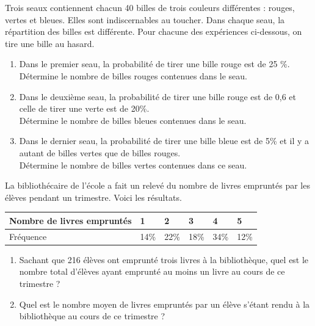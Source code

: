 \documentclass[../math2.tex]{subfiles}
\begin{document}
\begin{exercise}
    Trois seaux contiennent chacun 40 billes de trois couleurs différentes : rouges, vertes et bleues. Elles sont indiscernables au toucher. Dans chaque seau, la répartition des billes est différente. Pour chacune des expériences ci-dessous, on tire une bille au hasard.
    \begin{enumerate}[itemsep=4cm]
        \item Dans le premier seau, la probabilité de tirer une bille rouge est de 25 \%. \\Détermine le nombre de billes rouges contenues dans le seau.
        \item Dans le deuxième seau, la probabilité de tirer une bille rouge est de 0,6 et celle de tirer une verte est de 20\%. \\Détermine le nombre de billes bleues contenues dans le seau.
        \item Dans le dernier seau, la probabilité de tirer une bille bleue est de 5\% et il y a autant de billes vertes que de billes rouges. \\Détermine le nombre de billes vertes contenues dans ce seau.
        \vspace*{3cm}
    \end{enumerate}
\end{exercise}

\newpage

\begin{exercise}
    La bibliothécaire de l’école a fait un relevé du nombre de livres empruntés par les élèves pendant un trimestre. Voici les résultats.\\

    \begin{tabularx}{\linewidth}{|p{5cm}|Y|Y|Y|Y|Y|}
        \hline
        Nombre de livres empruntés & 1 & 2 & 3 & 4 & 5 \\
        \hline
        Fréquence & 14\% & 22\% & 18\% & 34\% & 12\% \\
        \hline 
    \end{tabularx}

    \begin{enumerate}[itemsep=4cm]
        \item Sachant que 216 élèves ont emprunté trois livres à la bibliothèque, quel est le nombre total d’élèves ayant emprunté au moins un livre au cours de ce trimestre ?
        \item Quel est le nombre moyen de livres empruntés par un élève s’étant rendu à la bibliothèque au cours de ce trimestre ?
        \vspace*{3cm}
    \end{enumerate}
\end{exercise}
\end{document}
